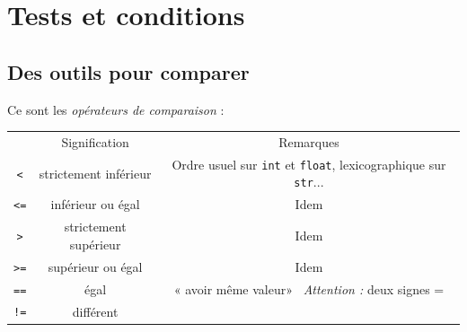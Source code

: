 \chapter{Tests et conditions}
\section{Des outils pour comparer}

Ce sont les \textit{opérateurs de comparaison} :\\

{\small
\tabularstyled
\begin{tabular}{CCC}
	 & {\boxfont\color{white} Signification} & {\boxfont\color{white} Remarques}                                                                     \\

	\texttt{<}                                       & strictement inférieur                 & Ordre usuel sur \texttt{int} et \texttt{float}, lexicographique sur \texttt{str}... \\

	\texttt{<=}                                      & inférieur ou égal                     & Idem                                                                                                  \\

	\texttt{>}                                       & strictement supérieur                 & Idem                                                                                                  \\

	\texttt{>=}                                      & supérieur ou égal                     & Idem                                                                                                  \\

	\texttt{==}                                      & égal                                  & « avoir même valeur» \  \textit{Attention :} deux signes =                                         \\

	\texttt{!=}                                      & différent                             &                                                                                                       \\


\end{tabular}}
